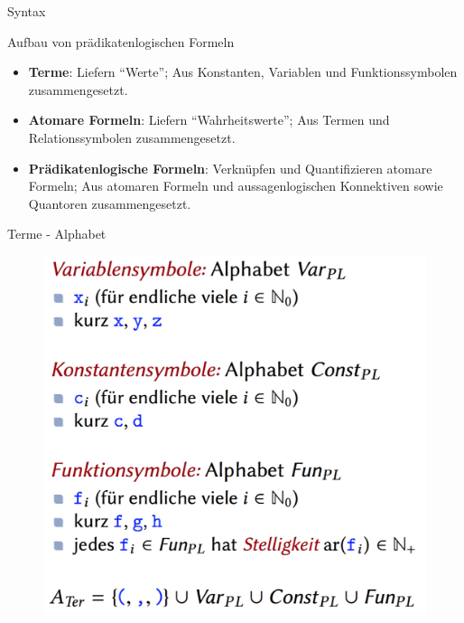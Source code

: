 \begin{frame}{Syntax}
	\begin{block}{Aufbau von prädikatenlogischen Formeln}
	\begin{itemize}[<+->]
		\item \textbf{Terme}: Liefern \enquote{Werte}; Aus Konstanten, Variablen und Funktionssymbolen zusammengesetzt.
		\item \textbf{Atomare Formeln}: Liefern \enquote{Wahrheitswerte}; Aus Termen und Relationssymbolen zusammengesetzt.
		\item \textbf{Prädikatenlogische Formeln}: Verknüpfen und Quantifizieren atomare Formeln; Aus atomaren Formeln und aussagenlogischen Konnektiven sowie Quantoren zusammengesetzt. 
	\end{itemize}
	\end{block}
\end{frame}


\begin{frame}{Terme - Alphabet}
\begin{figure}
	\centering
	\includegraphics[scale=0.2]{TermeAlphabet.png} \hspace{2em} 
\end{figure} 
\end{frame}

